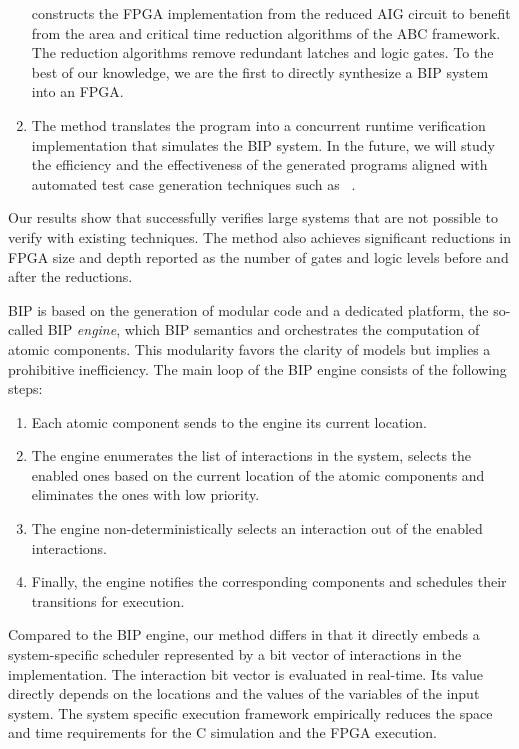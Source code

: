 \begin{enumerate}
  \biptool{} constructs the FPGA implementation from the reduced AIG circuit 
  to benefit from the area and critical time reduction algorithms 
  of the ABC framework. 
  The reduction algorithms remove redundant latches and logic gates.  
  To the best of our knowledge, we are the first to directly synthesize a BIP system into an FPGA. 

\item The method translates the \caig program into a concurrent runtime verification 
  implementation that simulates the BIP system.
In the future, we will study the efficiency and the effectiveness of the generated \caig programs aligned with automated test case generation techniques such as ~\cite{kbse-BurnimS08}.
\end{enumerate}
%

Our results show that \biptool{} successfully verifies large systems that are not possible to verify with existing techniques. 
The method also achieves significant reductions in FPGA size and depth reported as the 
number of gates and logic levels before and after the reductions.

BIP is based on the generation of modular code and a dedicated platform, the so-called BIP \emph{engine}, which  BIP semantics and orchestrates the computation of atomic components. This modularity favors the clarity of models but implies a prohibitive inefficiency. The main loop of the BIP engine consists of the following steps:
%
\begin{enumerate}
\item Each atomic component sends to the engine its current location.
\item The engine enumerates the list of interactions in the system, 
  selects the enabled ones based on the current location of the atomic 
  components and eliminates the ones with low priority.
\item The engine non-deterministically selects an interaction out of the enabled interactions.
\item Finally, the engine notifies the corresponding components and schedules their transitions for execution. 
\end{enumerate}
%
Compared to the BIP engine, our method differs in that it directly embeds a system-specific scheduler represented by a bit vector of interactions in the implementation.
The interaction bit vector is evaluated in real-time.
Its value directly depends on the locations and the values of the variables of the input system. 
The system specific execution framework empirically reduces the space and time requirements for the C simulation and the FPGA execution. 

